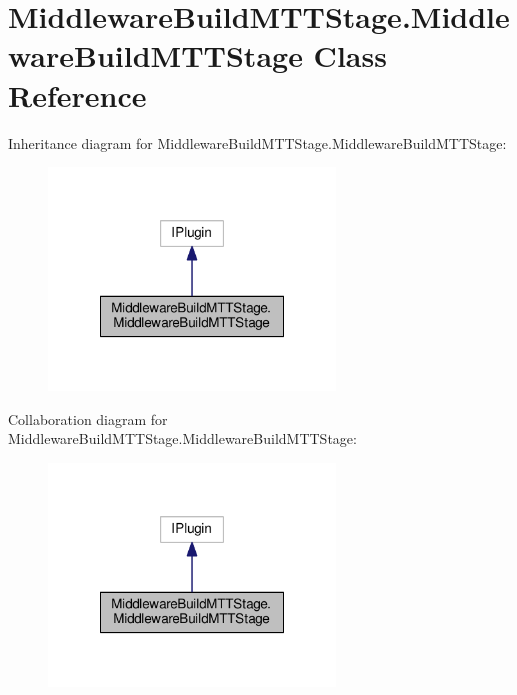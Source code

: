 \hypertarget{class_middleware_build_m_t_t_stage_1_1_middleware_build_m_t_t_stage}{\section{Middleware\-Build\-M\-T\-T\-Stage.\-Middleware\-Build\-M\-T\-T\-Stage Class Reference}
\label{class_middleware_build_m_t_t_stage_1_1_middleware_build_m_t_t_stage}
}


Inheritance diagram for Middleware\-Build\-M\-T\-T\-Stage.\-Middleware\-Build\-M\-T\-T\-Stage\-:
\nopagebreak
\begin{figure}[H]
\begin{center}
\leavevmode
\includegraphics[width=216pt]{class_middleware_build_m_t_t_stage_1_1_middleware_build_m_t_t_stage__inherit__graph}
\end{center}
\end{figure}


Collaboration diagram for Middleware\-Build\-M\-T\-T\-Stage.\-Middleware\-Build\-M\-T\-T\-Stage\-:
\nopagebreak
\begin{figure}[H]
\begin{center}
\leavevmode
\includegraphics[width=216pt]{class_middleware_build_m_t_t_stage_1_1_middleware_build_m_t_t_stage__coll__graph}
\end{center}
\end{figure}
